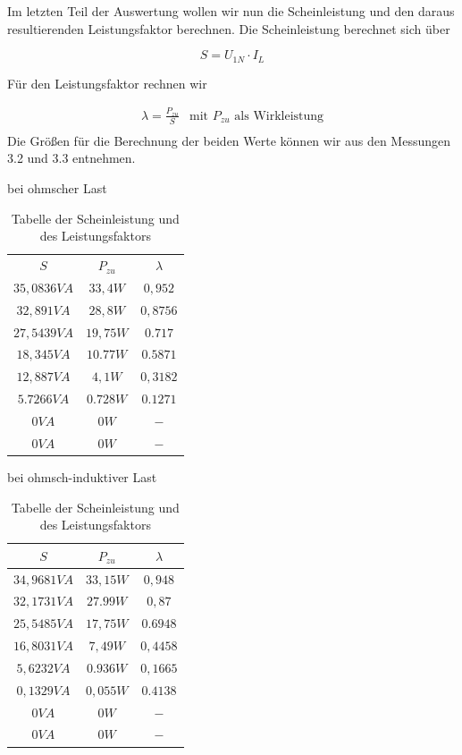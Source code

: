 \documentclass{article}
\begin{document}
Im letzten Teil der Auswertung wollen wir nun die Scheinleistung und den daraus resultierenden Leistungsfaktor berechnen. Die Scheinleistung berechnet sich über

$$S = U_{1N}\cdot I_{L}$$

Für den Leistungsfaktor rechnen wir

\[
  \begin{array}{ll}
    \lambda = \frac{P_{zu}}{S} & \text{mit $P_{zu}$ als Wirkleistung}\\
  \end{array}
\]
Die Größen für die Berechnung der beiden Werte können wir aus den Messungen 3.2 und 3.3 entnehmen.

\begin{table}[h]
  \centering
  \begin{subtable}{.5\linewidth}
    \centering
    \caption{bei ohmscher Last}
    \begin{tabular}{|c|c|c|}
      $S$ & $P_{zu}$ & $\lambda$ \\
      $35,0836VA$ & $33,4W$ & $0,952$\\
      $32,891VA$ & $28,8W$ & $0,8756$\\
      $27,5439VA$ & $19,75W$ & $0.717$\\
      $18,345VA$ & $10.77W$ & $0.5871$\\
      $12,887VA$ & $4,1W$ & $0,3182$\\
      $5.7266VA$ & $0.728W$ & $0.1271$\\
      $0VA$ & $0W$ & $-$\\
      $0VA$ & $0W$ & $-$\\
    \end{tabular}
  \end{subtable}
  \begin{subtable}{.5\linewidth}
    \centering
    \caption{bei ohmsch-induktiver Last}
    \begin{tabular}{|c|c|c|}
      \hline
      $S$ & $P_{zu}$ & $\lambda$ \\
      \hline
      $34,9681VA$ & $33,15W$ & $0,948$\\
      \hline
      $32,1731VA$ & $27.99W$ & $0,87$\\
      \hline
      $25,5485VA$ & $17,75W$ & $0.6948$\\
      \hline
      $16,8031VA$ & $7,49W$ & $0,4458$\\
      \hline
      $5,6232VA$ & $0.936W$ & $0,1665$\\
      \hline
      $0,1329VA$ & $0,055W$ & $0.4138$\\
      \hline
      $0VA$ & $0W$ & $-$\\
      \hline
      $0VA$ & $0W$ & $-$\\
      \hline
    \end{tabular}
  \end{subtable}
  \caption{Tabelle der Scheinleistung und des Leistungsfaktors}
  \label{tab:scheinfak}
\end{table}
\end{document}
